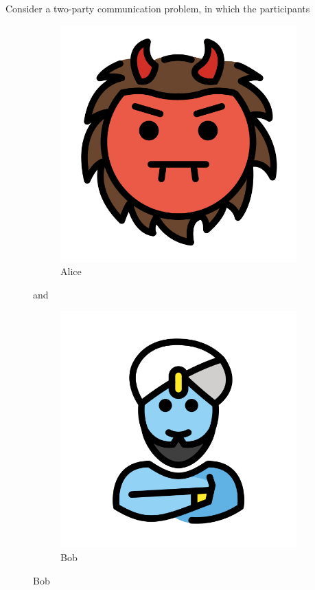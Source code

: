 \documentclass[12pt]{article}
\begin{document}
\maketitle

Consider a two-party communication problem,
	in which the participants

\begin{figure}[h]
\centering
\begin{subfigure}{.3\textwidth}
  \centering
  \includegraphics[width=.2\linewidth]{alice.png}
  \caption{Alice}
  \label{fig:alice}
\end{subfigure}%
and
\begin{subfigure}{.3\textwidth}
  \centering
  \includegraphics[width=.2\linewidth]{bob.png}
  \caption{Bob}
  \label{fig:bob}
\end{subfigure}
\label{fig:participants}
\end{figure}
\end{document}
